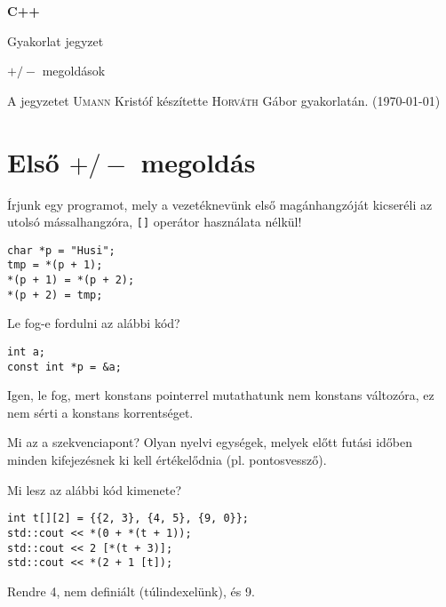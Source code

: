 \documentclass[a4paper,11.5pt]{article}
\begin{document}
	\setlength\parindent{0pt}
	\def\s{\hspace{0.2mm}\vphantom{\beta}}
	\def\Z{\mathbb{Z}}
	\def\Q{\mathbb{Q}}
	\def\R{\mathbb{R}}
	\def\C{\mathbb{C}}
	\def\N{\mathbb{N}}
	\def\Ra{\overline{\mathbb{R}}}
	
	\def\sume{\displaystyle\sum_{n=1}^{+\infty}}
	\def\sumn{\displaystyle\sum_{n=0}^{+\infty}}
	
	\def\narrow{\underset{n\rightarrow+\infty}{\longrightarrow}}
	\def\limn{\displaystyle\lim_{n\to +\infty}}
	\def\limx{\displaystyle\lim_{x\to +\infty}}
	
	\theoremstyle{definition}
	\newtheorem{theorem}{Tétel}[subsection] 
	
	\theoremstyle{definition}
	\newtheorem{definition}[theorem]{Definíció} 
	\newtheorem{example}[theorem]{Példa} 
	\newtheorem{task}[theorem]{Feladat} 
	\newtheorem{note}[theorem]{Megjegyzés}
	\begin{center}
		{\LARGE\textbf{C++}}
		
		{\Large Gyakorlat jegyzet}
		
		$+/-$ megoldások
	\end{center}A jegyzetet \textsc{Umann} Kristóf készítette \textsc{Horváth} Gábor gyakorlatán. (\today)
	\section{Első $+/-$ megoldás}
	Írjunk egy programot, mely a vezetéknevünk első magánhangzóját kicseréli az utolsó mássalhangzóra, \texttt{[]} operátor használata nélkül!
	\begin{lstlisting}
char *p = "Husi";
tmp = *(p + 1);
*(p + 1) = *(p + 2);
*(p + 2) = tmp;
	\end{lstlisting}
	Le fog-e fordulni az alábbi kód?
	\begin{lstlisting}
int a;
const int *p = &a;
	\end{lstlisting}
	Igen, le fog, mert konstans pointerrel mutathatunk nem konstans változóra, ez nem sérti a konstans korrentséget.
	
	\medskip
	Mi az a szekvenciapont? Olyan nyelvi egységek, melyek előtt futási időben minden kifejezésnek ki kell értékelődnia (pl. pontosvessző).
	
	\medskip
	Mi lesz az alábbi kód kimenete?
	\begin{lstlisting}
int t[][2] = {{2, 3}, {4, 5}, {9, 0}};
std::cout << *(0 + *(t + 1));
std::cout << 2 [*(t + 3)];
std::cout << *(2 + 1 [t]);
	\end{lstlisting}
	Rendre 4, nem definiált (túlindexelünk), és 9.
\end{document}
